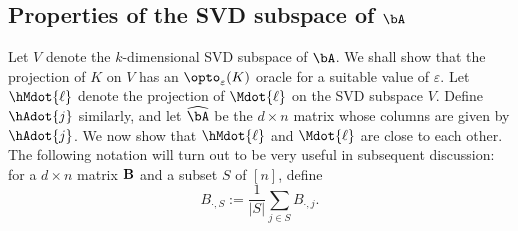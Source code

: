 
\subsection{Properties of the SVD subspace of $\bA$}
Let $V$ denote  the $k$-dimensional SVD subspace of $\bA$. We shall show that the projection of $K$ on $V$ has an   $\opto_\varepsilon(K)$ oracle for a suitable value of $\varepsilon$. Let $\hMdot{\ell}$ denote the projection of $\Mdot{\ell}$ on the SVD subspace $V$. Define $\hAdot{j}$ similarly, and let $\widehat{\bA}$ be the $d \times n$ matrix whose columns are given by $\hAdot{j}$. We now show that $\hMdot{\ell}$ and  $\Mdot{\ell}$ are close to each other. The following notation will turn out to be very useful in subsequent discussion: for a $d \times n$ matrix ${\bf B}$ and a subset $S$ of $[n]$, define 
$$ B_{\cdot, S} := \frac{1}{|S|} \sum_{j \in S} B_{\cdot, j}.$$


